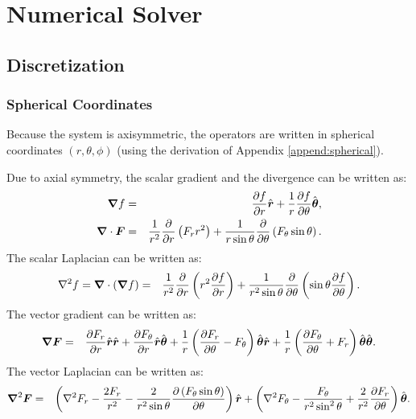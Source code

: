 \section{Numerical Solver}


\subsection{Discretization}
\subsubsection{Spherical Coordinates}
Because the system is axisymmetric, the operators are written in 
spherical coordinates $(r,\theta,\phi)$ 
(using the derivation of Appendix \ref{append:spherical}).

Due to axial symmetry, 
the scalar gradient and the divergence can be written as:
\begin{eqnarray}
\boldsymbol{\nabla} f &=& \frac{\partial f}{\partial r}\hat{\boldsymbol{r}} + \frac{1}{r}\frac{\partial f}{\partial \theta}\hat{\boldsymbol{\theta}}, \\
\boldsymbol{\nabla} \cdot \boldsymbol{F} &=& \frac{1}{r^2}\frac{\partial }{\partial r}\left(F_r r^2 \right) + 
               \frac{1}{r \sin\theta}\frac{\partial }{\partial \theta}\left(F_\theta \sin\theta\right).
\end{eqnarray}
The scalar Laplacian can be written as:
\begin{eqnarray}
\nabla^2 f = \boldsymbol{\nabla} \cdot (\boldsymbol{\nabla} f)&=& 
 \frac{1}{r^2}\frac{\partial }{\partial r}\left(r^2 \frac{\partial f}{\partial r}\right) + 
 \frac{1}{r^2 \sin\theta}\frac{\partial }{\partial \theta}\left(\sin\theta \frac{\partial f}{\partial \theta}\right).
\end{eqnarray}
The vector gradient can be written as:
\begin{eqnarray}
\boldsymbol{\nabla} \boldsymbol{F} &=& \frac{\partial F_r}{\partial r} \hat{\boldsymbol{r}} \hat{\boldsymbol{r}} + \frac{\partial F_\theta}{\partial r} \hat{\boldsymbol{r}} \hat{\boldsymbol{\theta}} + 
\frac{1}{r}\left(\frac{\partial F_r}{\partial \theta} - F_\theta\right) \hat{\boldsymbol{\theta}} \hat{\boldsymbol{r}} + 
\frac{1}{r}\left(\frac{\partial F_\theta}{\partial \theta} + F_r\right) \hat{\boldsymbol{\theta}} \hat{\boldsymbol{\theta}}.
\end{eqnarray}
The vector Laplacian can be written as:
\begin{eqnarray}
\boldsymbol{\nabla}^2 \boldsymbol{F} &=& 
\left(\nabla^2 F_r - \frac{2F_r}{r^2} - 
\frac{2}{r^2 \sin\theta} \frac{\partial \left(F_\theta \sin\theta \right)}{\partial \theta}\right)\hat{\boldsymbol{r}}
+ \left(\nabla^2 F_\theta - \frac{F_\theta}{r^2 \sin^2\theta} + 
\frac{2}{r^2}\frac{\partial F_r}{\partial \theta}\right) \hat{\boldsymbol{\theta}}.
\end{eqnarray}

